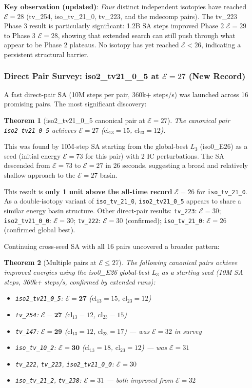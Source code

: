 \documentclass[11pt,a4paper]{article}
\newtheorem{theorem}{Theorem}[section]
\theoremstyle{remark}
\newcommand{\cl}{\mathrm{cl}}
\newcommand{\E}{\mathcal{E}}
\begin{document}
\textbf{Key observation (updated)}: \emph{Four} distinct independent isotopies have reached $\E=28$
(tv\_254, iso\_tv\_21\_0, tv\_223, and the mdecomp pairs). The tv\_223 Phase 3 result is
particularly significant: 1.2B SA steps improved Phase 2 $\E=29$ to Phase 3 $\E=28$, showing
that extended search can still push through what appear to be Phase 2 plateaus.
No isotopy has yet reached $\E < 26$, indicating a persistent structural barrier.

\subsubsection{Direct Pair Survey: iso2\_tv21\_0\_5 at $\E=27$ (New Record)}

A fast direct-pair SA (10M steps per pair, 360k+ steps/s) was launched across 16 promising
pairs. The most significant discovery:

\begin{theorem}[iso2\_tv21\_0\_5 canonical pair at $\E=27$]\label{thm:iso2_e27}
The canonical pair \texttt{iso2\_tv21\_0\_5} achieves $\E=27$ ($\cl_{13}=15$, $\cl_{23}=12$).
\end{theorem}

This was found by 10M-step SA starting from the global-best $L_3$ (iso0\_E26) as a seed
(initial energy $\E=73$ for this pair) with 2 IC perturbations. The SA descended from
$\E=73$ to $\E=27$ in 26 seconds, suggesting a broad and relatively shallow approach
to the $\E=27$ basin.

This result is \textbf{only 1 unit above the all-time record} $\E=26$ for
\texttt{iso\_tv\_21\_0}. As a double-isotopy variant of \texttt{iso\_tv\_21\_0},
\texttt{iso2\_tv21\_0\_5} appears to share a similar energy basin structure.
Other direct-pair results: \texttt{tv\_223}: $\E=30$; \texttt{iso2\_tv21\_0\_0}: $\E=30$;
\texttt{tv\_222}: $\E=30$ (confirmed); \texttt{iso\_tv\_21\_0}: $\E=26$ (confirmed global best).

Continuing cross-seed SA with all 16 pairs uncovered a broader pattern:

\begin{theorem}[Multiple pairs at $\E \leq 27$]\label{thm:multi_e27}
The following canonical pairs achieve improved energies using the iso0\_E26 global-best
$L_3$ as a starting seed (10M SA steps, 360k+ steps/s, confirmed by extended runs):
\begin{itemize}[noitemsep]
  \item \texttt{iso2\_tv21\_0\_5}: $\E=\mathbf{27}$ ($\cl_{13}=15$, $\cl_{23}=12$)
  \item \texttt{tv\_254}: $\E=\mathbf{27}$ ($\cl_{13}=12$, $\cl_{23}=15$)
  \item \texttt{tv\_147}: $\E=\mathbf{29}$ ($\cl_{13}=12$, $\cl_{23}=17$) --- was $\E=32$ in survey
  \item \texttt{iso\_tv\_10\_2}: $\E=\mathbf{30}$ ($\cl_{13}=18$, $\cl_{23}=12$) --- was $\E=31$
  \item \texttt{tv\_222}, \texttt{tv\_223}, \texttt{iso2\_tv21\_0\_0}: $\E=30$
  \item \texttt{iso\_tv\_21\_2}, \texttt{tv\_238}: $\E=31$ --- both improved from $\E=32$
\end{itemize}
\end{theorem}
\end{document}
